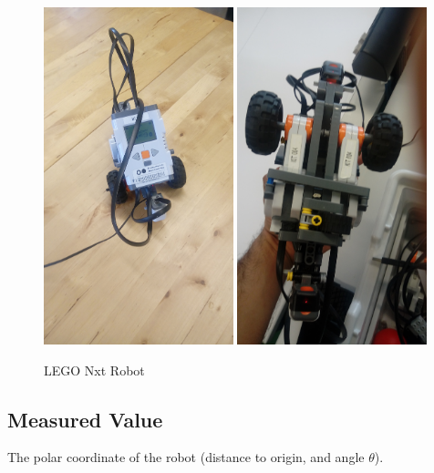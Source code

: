 \documentclass[10pt]{scrartcl}
\begin{document}
\begin{figure}[h!]
\centering
\caption{LEGO Nxt Robot}
\label{fig:1}
  \includegraphics[width=0.49\textwidth]{images/robot_1}
  \includegraphics[width=0.49\textwidth]{images/robot_2}
\end{figure}

\subsection*{Measured Value}
The polar coordinate of the robot (distance to origin, and angle $ \theta $).
\end{document}
